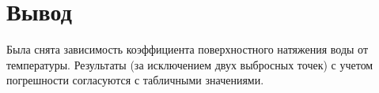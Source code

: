 \section{Вывод}
Была снята зависимость коэффициента поверхностного натяжения воды от температуры.
Результаты (за исключением двух выбросных точек) с учетом погрешности согласуются
с табличными значениями.